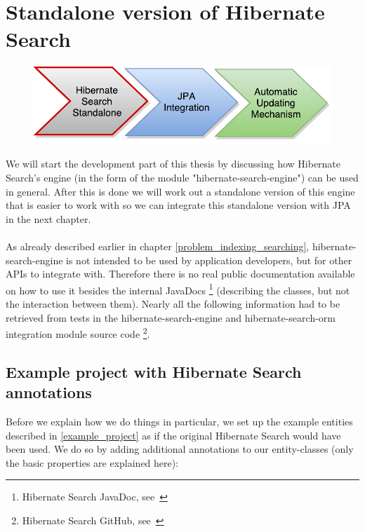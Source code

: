 
~
\pagebreak

\section{Standalone version of Hibernate Search} \label{standalone_chapter}

\begin{figure}[ht]
	\centering
	\includegraphics[scale=0.75]{images/timeline_genericjpa_first.pdf}
	\label{project_timeline_first}
\end{figure}
\noindent
We will start the development part of this thesis by discussing how Hibernate Search's engine (in the form of the module "hibernate-search-engine") can be used in general. After this is done we will work out a standalone version of this engine that is easier to work with so we can integrate this standalone version with JPA in the next chapter.
\\\\
As already described earlier in chapter \ref{problem_indexing_searching}, hibernate-search-engine is not intended to be used by application developers, but for other APIs to integrate with. Therefore there is no real public documentation available on how to use it besides the internal JavaDocs \footnote{Hibernate Search JavaDoc, see~\cite{hibernate_search_javadoc}} (describing the classes, but not the interaction between them). Nearly all the following information had to be retrieved from tests in the hibernate-search-engine and hibernate-search-orm integration module source code \footnote{Hibernate Search GitHub, see~\cite{hsearch_source_code_git}}.

\pagebreak

\subsection{Example project with Hibernate Search annotations} \label{setting_up_example_project}

Before we explain how we do things in particular, we set up the example entities described in \ref{example_project} as if the original Hibernate Search would have been used. We do so by adding additional annotations to our entity-classes (only the basic properties are explained here):

